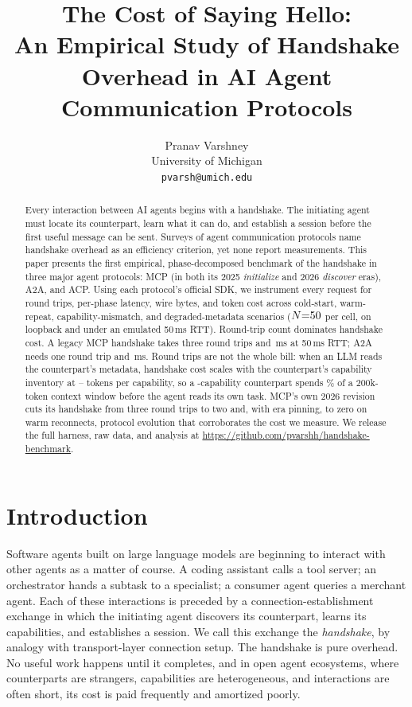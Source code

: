 \documentclass[10pt]{article}
\title{The Cost of Saying Hello:\\[0.25em]{\large An Empirical Study of
Handshake Overhead in AI Agent Communication Protocols}}
\author{%
  Pranav Varshney\\
  University of Michigan\\
  \texttt{pvarsh@umich.edu}%
}
\date{}
\begin{document}
\maketitle

\begin{abstract}
\noindent
Every interaction between AI agents begins with a handshake. The
initiating agent must locate its counterpart, learn what it can do, and
establish a session before the first useful message can be sent. Surveys
of agent communication protocols name handshake overhead as an efficiency
criterion, yet none report measurements. This paper presents the first
empirical, phase-decomposed benchmark of the handshake
in three major agent protocols: MCP (in both its 2025 \emph{initialize}
and 2026 \emph{discover} eras), A2A, and ACP. Using each protocol's
official SDK, we instrument every request for round trips, per-phase
latency, wire bytes, and token cost across cold-start, warm-repeat,
capability-mismatch, and degraded-metadata scenarios ($N{=}50{}$ per
cell, on loopback and under an emulated 50\,ms RTT). Round-trip count
dominates handshake cost. A legacy MCP handshake takes three round trips
and \SOneMcpLegacyRttMed{}\,ms at 50\,ms RTT; A2A needs one round trip
and \SOneAtoaRttMed{}\,ms. Round trips are not the whole bill: when an
LLM reads the counterpart's metadata, handshake cost scales with the
counterpart's capability inventory at \InvPerCapAtoa{}--\InvPerCapAcp{}
tokens per capability, so a \InvMaxN{}-capability counterpart spends
\InvMaxCtxPct{}\% of a 200k-token context window before the agent reads
its own task. MCP's own 2026
revision cuts its handshake from three round trips to two and, with era
pinning, to zero on warm reconnects, protocol evolution that corroborates
the cost we measure. We release the full harness, raw data, and analysis
at \url{https://github.com/pvarshh/handshake-benchmark}.
\end{abstract}




\section{Introduction}
\label{sec:intro}

Software agents built on large language models are beginning to interact
with other agents as a matter of course. A coding assistant calls a tool
server; an orchestrator hands a subtask to a specialist; a consumer agent
queries a merchant agent. Each of these interactions is preceded by a
connection-establishment exchange in which the initiating agent discovers
its counterpart, learns its capabilities, and establishes a session. We
call this exchange the \emph{handshake}, by analogy with transport-layer
connection setup. The handshake is pure overhead. No useful work happens
until it completes, and in open agent ecosystems, where counterparts are
strangers, capabilities are heterogeneous, and interactions are often
short, its cost is paid frequently and amortized poorly.
\end{document}
